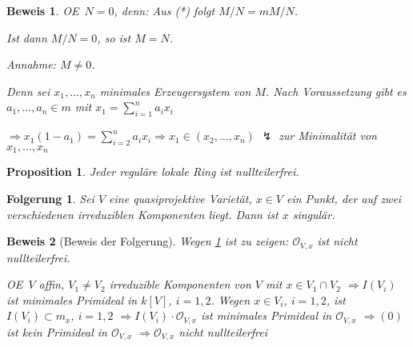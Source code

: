 \documentclass[a4paper, 12pt, numbers=noendperiod, chapterprefix=true, headsepline]{scrbook}
\theoremstyle{break}
\newtheorem{Prop}[Def]{Proposition}
\newtheorem{Folg}[Def]{Folgerung}
\theoremstyle{nonumberbreak}
\newtheorem{Bew}{Beweis}
\theoremstyle{nonumberplain}
\newcommand{\Sum}{\sum\limits}
\newcommand{\calO}{\mathcal{O}}
\renewcommand{\OE}{O\!\!E~}
\begin{document}
\begin{Bew}
\OE $N=0$, denn: Aus (*) folgt $M/N=mM/N$.

Ist dann $M/N=0$, so ist $M=N$.

\emph{Annahme:} $M\ne0$.

Denn sei $x_1,\ldots ,x_n$ minimales Erzeugersystem von $M$. Nach Voraussetzung gibt es $a_1,\ldots ,a_n\in m$ mit $x_1=\sum_{i=1}^na_ix_i$

$\Rightarrow x_1(1-a_1)=\Sum_{i=2}^na_ix_i \Rightarrow x_1\in (x_2,\ldots ,x_n)$ $\lightning$ zur Minimalit\"at von $x_1,\ldots ,x_n$
\end{Bew}

\begin{Prop}\label{19.6}
Jeder regul\"are lokale Ring ist nullteilerfrei.
\end{Prop}

\begin{Folg}
Sei $V$ eine quasiprojektive Variet\"at, $x\in V$ ein Punkt, der auf zwei verschiedenen irreduziblen Komponenten liegt. Dann ist $x$ singul\"ar.
\end{Folg}

\begin{Bew}[Beweis der Folgerung]
Wegen \ref{19.6} ist zu zeigen: $\calO_{V,x}$ ist nicht nullteilerfrei.

\OE $V$ affin, $V_1\ne V_2$ irreduzible Komponenten von $V$ mit $x\in V_1\cap V_2$ $\Rightarrow I(V_i)$ ist minimales Primideal in $k[V]$, $i=1,2$. Wegen $x\in V_i$, $i=1,2$, ist $I(V_i)\subset m_x$, $i=1,2$ $\Rightarrow I(V_i)\cdot \calO_{V,x}$ ist minimales Primideal in $\calO_{V,x}$ $\Rightarrow (0)$ ist kein Primideal in $\calO_{V,x}$ $\Rightarrow \calO_{V,x}$ nicht nullteilerfrei
\end{Bew}
\end{document}
